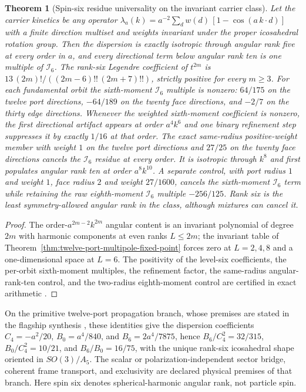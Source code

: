 \documentclass[11pt]{article}
\newtheorem{theorem}{Theorem}[section]
\theoremstyle{remark}
\theoremstyle{plain}
\begin{document}
\begin{theorem}[Spin-six residue universality on the invariant carrier class]
\label{thm:spin-six-residue-universality}
Let the carrier kinetics be any operator
\(\lambda_a(k)=a^{-2}\sum_d w(d)\,[1-\cos(a\,k\cdot d)]\) with a finite
direction multiset and weights invariant under the proper icosahedral
rotation group. Then the dispersion is exactly isotropic through angular rank
five at every order in \(a\), and every directional term below angular rank
ten is one multiple of \(\mathcal I_6\). The rank-six Legendre coefficient of
\(t^{2m}\) is \(13\,(2m)!/((2m-6)!!\,(2m+7)!!)\), strictly positive for every
\(m\ge3\). For each fundamental orbit the sixth-moment \(\mathcal I_6\)
multiple is nonzero: \(64/175\) on the twelve port directions, \(-64/189\) on
the twenty face directions, and \(-2/7\) on the thirty edge directions.
Whenever the weighted sixth-moment coefficient is nonzero, the first
directional artifact appears at order \(a^4k^6\) and one binary refinement
step suppresses it by exactly \(1/16\) at that order. The exact same-radius
positive-weight member with weight \(1\) on the twelve port directions and
\(27/25\) on the twenty face directions cancels the \(\mathcal I_6\)
residue at every order. It is isotropic through \(k^8\) and first populates
angular rank ten at order \(a^8k^{10}\). A separate control, with port
radius \(1\) and weight \(1\), face radius \(2\) and weight \(27/1600\),
cancels the sixth-moment \(\mathcal I_6\) term while retaining the raw
eighth-moment \(\mathcal I_6\) multiple \(-256/125\). Rank six is the least
symmetry-allowed angular rank in the class, although mixtures can cancel it.
\end{theorem}

\begin{proof}
The order-\(a^{2m-2}k^{2m}\) angular content is an invariant polynomial of
degree \(2m\) with harmonic components at even ranks \(L\le2m\); the
invariant table of Theorem~\ref{thm:twelve-port-multipole-fixed-point}
forces zero at \(L=2,4,8\) and a one-dimensional space at \(L=6\). The
positivity of the level-six coefficients, the per-orbit sixth-moment
multiples, the refinement factor, the same-radius angular-rank-ten control,
and the two-radius eighth-moment control are certified in exact arithmetic
\cite{ophrepo}.
\end{proof}

On the primitive twelve-port propagation branch, whose premises are stated in the flagship synthesis \cite{ophsynthesis}, these identities give the
dispersion coefficients \(C_4=-a^2/20\), \(B_0=a^4/840\), and
\(B_6=2a^4/7875\), hence \(B_6/C_4^2=32/315\), \(B_0/C_4^2=10/21\), and
\(B_6/B_0=16/75\), with the unique rank-six icosahedral shape oriented in
\(SO(3)/A_5\). The scalar or polarization-independent sector bridge, coherent
frame transport, and exclusivity are declared physical premises of that
branch. Here spin six denotes spherical-harmonic angular rank, not particle
spin.
\end{document}
